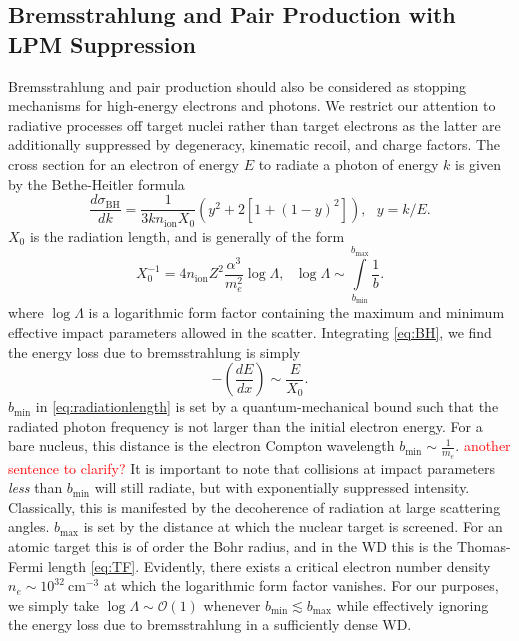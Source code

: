 \documentclass[twocolumn,showpacs,preprintnumbers,amsmath,amssymb,prd]{revtex4}
\newcommand{\OO}{\mathcal{O}}
\def\r{\right)}
\def\l{\left(}
\begin{document}
\begin{appendices}
\subsection*{Bremsstrahlung and Pair Production with LPM Suppression}
Bremsstrahlung and pair production should also be considered as stopping mechanisms for high-energy electrons and photons. We restrict our attention to radiative processes off target nuclei rather than target electrons as the latter are additionally suppressed by degeneracy, kinematic recoil, and charge factors. 
The cross section for an electron of energy $E$ to radiate a photon of energy $k$ is given by the Bethe-Heitler formula
\begin{equation}
\label{eq:BH}
\frac{d \sigma_\text{BH}}{dk} = \frac{1}{3 k n_\text{ion} X_0} (y^2+2 [1+ (1-y)^2]), ~~~ y = k/E.
\end{equation}
$X_0$ is the radiation length, and is generally of the form
\begin{equation}
\label{eq:radiationlength}
X_0^{-1} = 4 n_\text{ion} Z^2 \frac{\alpha^3}{m_e^2} \log{\Lambda}, ~~~ \log{\Lambda} \sim \int \limits_{b_\text{min}}^{b_\text{max}} \frac{1}{b}.
\end{equation}
where $\log{\Lambda}$ is a logarithmic form factor containing the maximum and minimum effective impact parameters allowed in the scatter.
Integrating \eqref{eq:BH}, we find the energy loss due to bremsstrahlung is simply 
\begin{equation}
-\l\frac{dE}{dx}\r \sim \frac{E}{X_0}.
\end{equation}
$b_\text{min}$ in \eqref{eq:radiationlength} is set by a quantum-mechanical bound such that the radiated photon frequency is not larger than the initial electron energy. 
For a bare nucleus, this distance is the electron Compton wavelength $b_\text{min} \sim \frac{1}{m_e}$. \textcolor{red}{another sentence to clarify?}
It is important to note that collisions at impact parameters \emph{less} than $b_\text{min}$ will still radiate, but with exponentially suppressed intensity.
Classically, this is manifested by the decoherence of radiation at large scattering angles.
$b_\text{max}$ is set by the distance at which the nuclear target is screened.
For an atomic target this is of order the Bohr radius, and in the WD this is the Thomas-Fermi length \eqref{eq:TF}.
Evidently, there exists a critical electron number density $n_e \sim 10^{32} ~\text{cm}^{-3}$ at which the logarithmic form factor vanishes.
For our purposes, we simply take $\log{\Lambda} \sim \OO(1)$ whenever $b_\text{min} \lesssim b_\text{max}$ while effectively ignoring the energy loss due to bremsstrahlung in a sufficiently dense WD.


\end{appendices}
\end{document}
